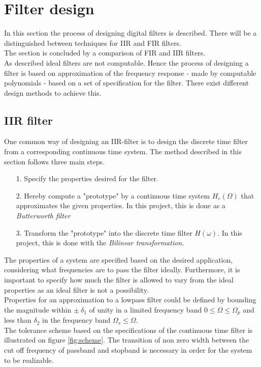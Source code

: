\section{Filter design}
In this section the process of designing digital filters is described. There will be a distinguished between techniques for IIR and FIR filters.\\ The section is concluded by a comparison of FIR and IIR filters.\\  
As described ideal filters are not computable. Hence the process of designing a filter is based on approximation of the frequency response - made by computable polynomials - based on a set of specification for the filter. There exist different design methods to achieve this.   
\subsection{IIR filter}
One common way of designing an IIR-filter is to design the discrete time filter from a corresponding continuous time system. The method described in this section follows three main steps. 
\begin{itemize}
\item[1.] Specify the properties desired for the filter.
\item[2.] Hereby compute a "prototype" by a continuous time system $H_c(\Omega)$ that approximates the given properties. In this project, this is done as a \textit{Butterworth filter}  
\item[3.] Transform the "prototype" into the discrete time filter $H(\omega)$. In this project, this is done with the \textit{Bilinear transformation}. 
\end{itemize}
The properties of a system are specified based on the desired application, considering what frequencies are to pass the filter ideally. Furthermore, it is important to specify how much the filter is allowed to vary from the ideal properties as an ideal filter is not a possibility. \\
Properties for an approximation to a lowpass filter could be defined by bounding the magnitude within $\pm \ \delta_1$ of unity in a limited frequency band $0 \leq \Omega \leq \Omega_p $ and less than $\delta_2$ in the frequency band $\Omega_s \leq \Omega$. \\
The tolerance scheme based on the specifications of the continuous time filter is illustrated on figure \ref{fig:scheme}.
The transition of non zero width between the cut off frequency of passband and stopband is necessary in order for the system to be realizable.

